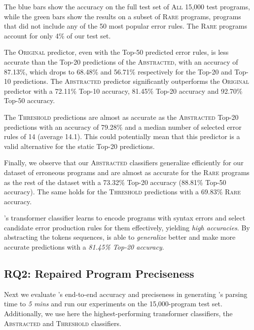 The blue bars show the accuracy on the full test set of \textsc{All} 15,000 test
programs, while the green bars show the results on a subset of \textsc{Rare}
programs, \ie programs that did not include any of the 50 most popular error
rules. The \textsc{Rare} programs account for only 4\% of our test set.

The \textsc{Original} predictor, even with the Top-50 predicted error rules, is
less accurate than the Top-20 predictions of the \textsc{Abstracted}, with an
accuracy of 87.13\%, which drops to 68.48\% and 56.71\% respectively for the
Top-20 and Top-10 predictions. The \textsc{Abstracted} predictor significantly
outperforms the \textsc{Original} predictor with a 72.11\% Top-10 accuracy,
81.45\% Top-20 accuracy and 92.70\% Top-50 accuracy.

The \textsc{Threshold} predictions are almost as accurate as the
\textsc{Abstracted} Top-20 predictions with an accuracy of 79.28\% and a median
number of selected error rules of 14 (average 14.1). This could potentially mean
that this predictor is a valid alternative for the static Top-20 predictions.

Finally, we observe that our \textsc{Abstracted} classifiers generalize
efficiently for our dataset of erroneous \python programs and are almost as
accurate for the \textsc{Rare} programs as the rest of the dataset with a
73.32\% Top-20 accuracy (88.81\% Top-50 accuracy). The same holds for the
\textsc{Threshold} predictions with a 69.83\% \textsc{Rare} accuracy.

\begin{framed}
  \noindent \toolname's transformer classifier learns to encode programs with
  syntax errors and select candidate error production rules for them
  effectively, yielding \emph{high accuracies}. By abstracting the tokens
  sequences, \toolname is able to \emph{generalize} better and make more
  accurate predictions with a \emph{81.45\% Top-20 accuracy}.
\end{framed}


\subsection{RQ2: Repaired Program Preciseness}
\label{sec:eval:precise}

Next we evaluate \toolname's end-to-end accuracy and preciseness in generating
\toolname's parsing time to \emph{5 mins} and run our experiments on the
15,000-program test set. Additionally, we use here the highest-performing
transformer classifiers, \ie the \textsc{Abstracted} and \textsc{Threshold}
classifiers.

